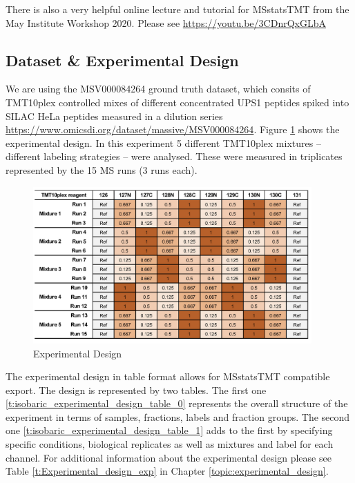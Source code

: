 \noindent There is also a very helpful online lecture and tutorial for MSstatsTMT from the May Institute Workshop 2020. Please see \url{https://youtu.be/3CDnrQxGLbA}

\subsection{Dataset \& Experimental Design}
We are using the MSV000084264 ground truth dataset, which consits of TMT10plex controlled mixes of different concentrated UPS1 peptides spiked into SILAC HeLa peptides measured in a dilution series \url{https://www.omicsdi.org/dataset/massive/MSV000084264}. Figure \ref{fig:isobaric_experimental_design} shows the experimental design. In this experiment 5 different TMT10plex mixtures -- different labeling strategies -- were analysed. These were measured in triplicates represented by the 15 MS runs (3 runs each). 

\begin{figure}[htbp]
  \centering
 \includegraphics[width=0.95\textwidth]{graphics/isobaric/isobaric_experimental_design.jpg}
  \caption{Experimental Design}
  \label{fig:isobaric_experimental_design}
\end{figure}
  
\noindent The experimental design in table format allows for MSstatsTMT compatible export. The design is represented by two tables. The first one \ref{t:isobaric_experimental_design_table_0} represents the overall structure of the experiment in terms of samples, fractions, labels and fraction groups. The second one \ref{t:isobaric_experimental_design_table_1} adds to the first by specifying specific conditions, biological replicates as well as mixtures and label for each channel. For additional information about the experimental design please see Table  \ref{t:Experimental_design_exp} in Chapter \ref{topic:experimental_design}. 

